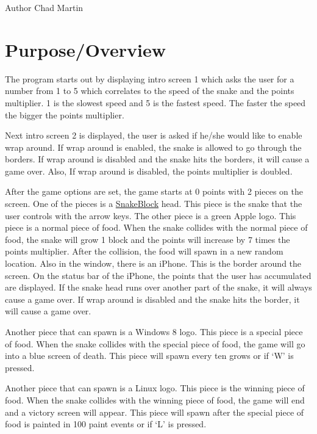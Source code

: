 \begin{DoxyAuthor}{\-Author}
\-Chad \-Martin
\end{DoxyAuthor}


 \hypertarget{index_Overview}{}\section{\-Purpose/\-Overview}\label{index_Overview}
\-The program starts out by displaying intro screen 1 which asks the user for a number from 1 to 5 which correlates to the speed of the snake and the points multiplier. 1 is the slowest speed and 5 is the fastest speed. \-The faster the speed the bigger the points multiplier. 

\-Next intro screen 2 is displayed, the user is asked if he/she would like to enable wrap around. \-If wrap around is enabled, the snake is allowed to go through the borders. \-If wrap around is disabled and the snake hits the borders, it will cause a game over. \-Also, \-If wrap around is disabled, the points multiplier is doubled. 

\-After the game options are set, the game starts at 0 points with 2 pieces on the screen. \-One of the pieces is a \hyperlink{classSnakeBlock}{\-Snake\-Block} head. \-This piece is the snake that the user controls with the arrow keys. \-The other piece is a green \-Apple logo. \-This piece is a normal piece of food. \-When the snake collides with the normal piece of food, the snake will grow 1 block and the points will increase by 7 times the points multiplier. \-After the collision, the food will spawn in a new random location. \-Also in the window, there is an i\-Phone. \-This is the border around the screen. \-On the status bar of the i\-Phone, the points that the user has accumulated are displayed. \-If the snake head runs over another part of the snake, it will always cause a game over. \-If wrap around is disabled and the snake hits the border, it will cause a game over. 

\-Another piece that can spawn is a \-Windows 8 logo. \-This piece is a special piece of food. \-When the snake collides with the special piece of food, the game will go into a blue screen of death. \-This piece will spawn every ten grows or if ‘\-W’ is pressed. 

\-Another piece that can spawn is a \-Linux logo. \-This piece is the winning piece of food. \-When the snake collides with the winning piece of food, the game will end and a victory screen will appear. \-This piece will spawn after the special piece of food is painted in 100 paint events or if ‘\-L’ is pressed. 

